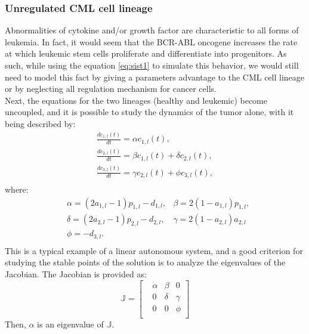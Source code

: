 \documentclass[a4paper,10pt]{article}
\begin{document}
\subsubsection{Unregulated CML cell lineage}
Abnormalities of cytokine and/or growth factor are characteristic to all forms of leukemia. 
In fact, it would seem that the BCR-ABL oncogene increases the rate at which leukemic stem
cells proliferate and differentiate into progenitors. As such, while using the equation \eqref{eq:sist1} 
to simulate this behavior, we would still need to model this fact by giving a parameters advantage 
to the CML cell lineage or by neglecting all regulation mechanism for cancer cells.\\
Next, the equations for the two lineages (healthy and leukemic) become uncoupled,
and it is possible to study the dynamics of the tumor alone,  with it being described by:
\begin{equation}
\begin{array}{ll}
\frac{dc_{1,l}(t)}{dt}=\alpha c_{1,l}(t), \\
\frac{dc_{2,l}(t)}{dt}=\beta c_{1,l}(t)+\delta c_{2,l}(t),\\
\frac{dc_{3,l}(t)}{dt}= \gamma c_{2,l}(t)+ \phi c_{3,l}(t),\\
\end{array}
\label{eq:sist-semplificato}
\end{equation}
where:
\begin{equation}
\begin{array}{lll}
&\alpha=(2a_{1,l}-1)p_{1,l}-d_{1,l},& \beta=2(1-a_{1,l})p_{1,l}, \\
&\delta=(2a_{2,l}-1)p_{2,l}-d_{2,l},& \gamma=2(1-a_{2,l})a_{2,l} \\
&\phi=-d_{3,l}.& \\
\end{array}
\end{equation} 
This is a typical  example of a linear autonomous system, 
and a good criterion for studying the stable points of the solution is
to analyze the eigenvalues of the Jacobian. 
The Jacobian is provided as:
\begin{equation}
\mathbb{J}= \begin{bmatrix}
&\alpha &\beta & 0\\
&0 & \delta & \gamma\\
& 0 & 0 & \phi \\
\end{bmatrix}
\end{equation}
Then, $\alpha$ is an eigenvalue of $\mathbb{J}$.\\
\end{document}
